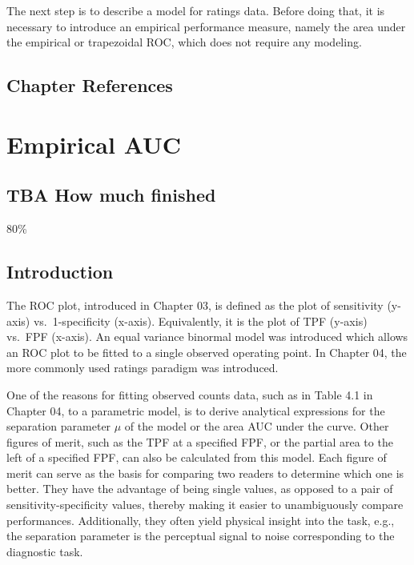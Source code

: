 \documentclass[
]{book}
\begin{document}
The next step is to describe a model for ratings data. Before doing that, it is necessary to introduce an empirical performance measure, namely the area under the empirical or trapezoidal ROC, which does not require any modeling.

\hypertarget{ratings-paradigm-references}{%
\section{Chapter References}\label{ratings-paradigm-references}}

\hypertarget{empirical-auc}{%
\chapter{Empirical AUC}\label{empirical-auc}}

\hypertarget{empirical-auc-how-much-finished}{%
\section{TBA How much finished}\label{empirical-auc-how-much-finished}}

80\%

\hypertarget{empirical-auc-introduction}{%
\section{Introduction}\label{empirical-auc-introduction}}

The ROC plot, introduced in Chapter 03, is defined as the plot of sensitivity (y-axis) vs.~1-specificity (x-axis). Equivalently, it is the plot of TPF (y-axis) vs.~FPF (x-axis). An equal variance binormal model was introduced which allows an ROC plot to be fitted to a single observed operating point. In Chapter 04, the more commonly used ratings paradigm was introduced.

One of the reasons for fitting observed counts data, such as in Table 4.1 in Chapter 04, to a parametric model, is to derive analytical expressions for the separation parameter \(\mu\) of the model or the area AUC under the curve. Other figures of merit, such as the TPF at a specified FPF, or the partial area to the left of a specified FPF, can also be calculated from this model. Each figure of merit can serve as the basis for comparing two readers to determine which one is better. They have the advantage of being single values, as opposed to a pair of sensitivity-specificity values, thereby making it easier to unambiguously compare performances. Additionally, they often yield physical insight into the task, e.g., the separation parameter is the perceptual signal to noise corresponding to the diagnostic task.
\end{document}
